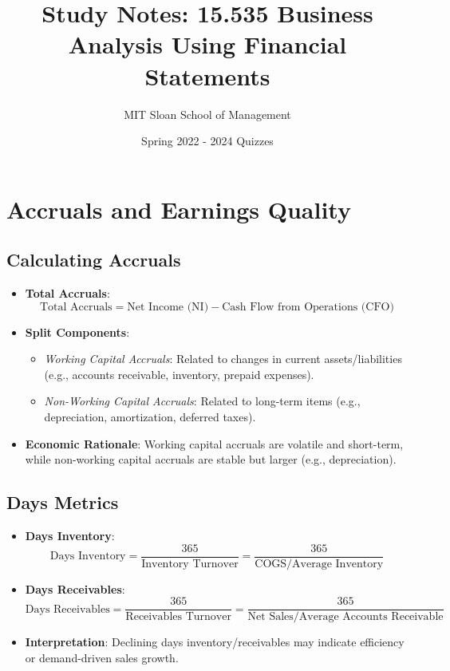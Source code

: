 \documentclass{article}
\title{Study Notes: 15.535 Business Analysis Using Financial Statements}
\author{MIT Sloan School of Management}
\date{Spring 2022 - 2024 Quizzes}
\begin{document}
\maketitle

\section{Accruals and Earnings Quality}
\subsection{Calculating Accruals}
\begin{itemize}
    \item \textbf{Total Accruals}: 
    \[
    \text{Total Accruals} = \text{Net Income (NI)} - \text{Cash Flow from Operations (CFO)}
    \]
    \item \textbf{Split Components}:
    \begin{itemize}
        \item \textit{Working Capital Accruals}: Related to changes in current assets/liabilities (e.g., accounts receivable, inventory, prepaid expenses).
        \item \textit{Non-Working Capital Accruals}: Related to long-term items (e.g., depreciation, amortization, deferred taxes).
    \end{itemize}
    \item \textbf{Economic Rationale}: Working capital accruals are volatile and short-term, while non-working capital accruals are stable but larger (e.g., depreciation).
\end{itemize}

\subsection{Days Metrics}
\begin{itemize}
    \item \textbf{Days Inventory}:
    \[
    \text{Days Inventory} = \frac{365}{\text{Inventory Turnover}} = \frac{365}{\text{COGS} / \text{Average Inventory}}
    \]
    \item \textbf{Days Receivables}:
    \[
    \text{Days Receivables} = \frac{365}{\text{Receivables Turnover}} = \frac{365}{\text{Net Sales} / \text{Average Accounts Receivable}}
    \]
    \item \textbf{Interpretation}: Declining days inventory/receivables may indicate efficiency or demand-driven sales growth.
\end{itemize}
\end{document}
